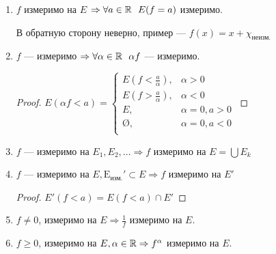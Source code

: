 \begin{prop}\itemfix
    \begin{enumerate}
        \item \(f\) измеримо на \(E\) \( \Rightarrow \forall a\in\mathbb{R} \ \ E(f = a)\) измеримо.

              В обратную сторону неверно, пример --- \(f(x) = x + \chi_\text{неизм.}\)

        \item \(f\) --- измеримо \( \Rightarrow \forall \alpha\in\R \ \ \alpha f\) --- измеримо.

              \begin{proof}
                  \(E(\alpha f < a) = \begin{cases}
                      E(f < \frac{a}{\alpha}), & \alpha > 0        \\
                      E(f > \frac{a}{\alpha}), & \alpha < 0        \\
                      E,                       & \alpha = 0, a > 0 \\
                      \text{\O},               & \alpha = 0, a < 0 \\
                  \end{cases}\)
              \end{proof}
        \item \(f\) --- измеримо на \(E_1, E_2, \dots \Rightarrow f\) измеримо на \(E = \bigcup E_k\)
        \item \(f\) --- измеримо на \(E, \text{E}_{\text{изм.}}'\subset E \Rightarrow f\) измеримо на \(E'\)
              \begin{proof}
                  \(E'(f < a) = E(f < a)\cap E'\)
              \end{proof}
        \item \(f \neq 0\), измеримо на \(E \Rightarrow \frac{1}{f}\) измеримо на \(E\).
        \item \(f \geq 0\), измеримо на \(E, \alpha\in\mathbb{R} \Rightarrow f^\alpha\) измеримо на \(E\).
    \end{enumerate}
\end{prop}

